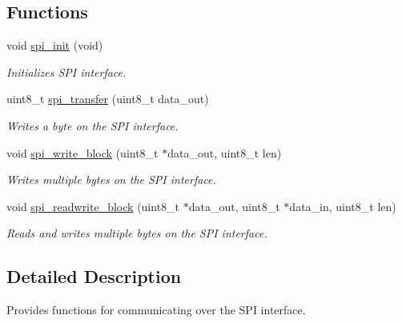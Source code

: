 \subsection*{Functions}
\begin{DoxyCompactItemize}
\item 
\hypertarget{group___s_p_i_gae909944aa85ae98323073c628be541aa}{void \hyperlink{group___s_p_i_gae909944aa85ae98323073c628be541aa}{spi\-\_\-init} (void)}\label{group___s_p_i_gae909944aa85ae98323073c628be541aa}

\begin{DoxyCompactList}\small\item\em Initializes S\-P\-I interface. \end{DoxyCompactList}\item 
uint8\-\_\-t \hyperlink{group___s_p_i_gaf1cb8cd50ad17c3847c2204d7b51a1dd}{spi\-\_\-transfer} (uint8\-\_\-t data\-\_\-out)
\begin{DoxyCompactList}\small\item\em Writes a byte on the S\-P\-I interface. \end{DoxyCompactList}\item 
void \hyperlink{group___s_p_i_gac560dc0230174b945dc468c1cfd1d779}{spi\-\_\-write\-\_\-block} (uint8\-\_\-t $\ast$data\-\_\-out, uint8\-\_\-t len)
\begin{DoxyCompactList}\small\item\em Writes multiple bytes on the S\-P\-I interface. \end{DoxyCompactList}\item 
void \hyperlink{group___s_p_i_ga8cfadb337b7eb5584858d6bae33d489c}{spi\-\_\-readwrite\-\_\-block} (uint8\-\_\-t $\ast$data\-\_\-out, uint8\-\_\-t $\ast$data\-\_\-in, uint8\-\_\-t len)
\begin{DoxyCompactList}\small\item\em Reads and writes multiple bytes on the S\-P\-I interface. \end{DoxyCompactList}\end{DoxyCompactItemize}


\subsection{Detailed Description}
Provides functions for communicating over the S\-P\-I interface. 


